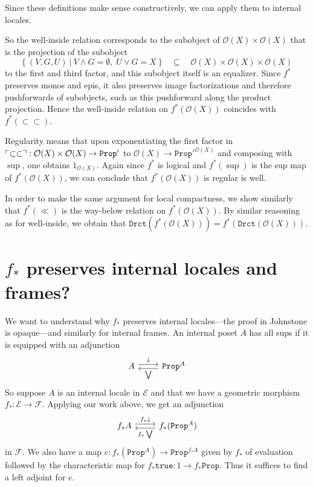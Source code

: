 \documentclass[11pt, oneside, article]{memoir}
\theoremstyle{plain}
\theoremstyle{definition}
\theoremstyle{remark}
\DeclarePairedDelimiter{\classify}{\ulcorner}{\urcorner}
\newcommand{\const}[1]{\mathtt{#1}}
\newcommand{\cat}[1]{\mathcal{#1}}
\newcommand{\Prop}{\const{Prop}}
\newcommand{\down}{\mathord{\downarrow}}
\newcommand{\true}{\const{true}}
\begin{document}
Since these definitions make sense constructively, we can apply them to internal locales.

So the well-inside relation corresponds to the subobject of $\mathcal{O}(X)\times\mathcal{O}(X)$ that is the projection of the subobject
\[
	\{ \: (V,G,U) \:|\: V\wedge G = \emptyset, \; U\vee G = X \: \} \quad \subseteq \quad \mathcal{O}(X)\times\mathcal{O}(X)\times\mathcal{O}(X)
\]
to the first and third factor, and this subobject itself is an equalizer. Since $f^*$ preserves monos and epis, it also preserves image factorizations and therefore pushforwards of subobjects, such as this pushforward along the product projection. Hence the well-inside relation on $f^*(\mathcal{O}(X))$ coincides with $f^*(\subset\subset)$.

Regularity means that upon exponentiating the first factor in $\classify{\subset\subset} : \mathcal{O}(X)\times\mathcal{O}(X)\to\Prop'$ to $\mathcal{O}(X)\to\Prop'^{\mathcal{O}(X)}$ and composing with $\sup$, one obtains $1_{\mathcal{O}(X)}$. Again since $f^*$ is logical and $f^*(\sup)$ is the sup map of $f^*(\mathcal{O}(X))$, we can conclude that $f^*(\mathcal{O}(X))$ is regular is well.

In order to make the same argument for local compactness, we show similarly that $f^*(\ll)$ is the way-below relation on $f^*(\mathcal{O}(X))$. By similar reasoning as for well-inside, we obtain that $\const{Drct}(f^*(\mathcal{O}(X))) = f^*(\const{Drct}(\mathcal{O}(X)))$.

\section{$f_*$ preserves internal locales and frames?}\label{sec.preserve_loc_frame}


We want to understand why $f_*$ preserves internal locales---the proof in Johnstone is opaque---and similarly for internal frames. An internal poset $A$ has all sups if it is equipped with an adjunction
\[
\begin{tikzcd}
	A\ar[r, shift left, "\down"]&\Prop^A\ar[l, shift left, "\bigvee"]
\end{tikzcd}
\]
So suppose $A$ is an internal locale in $\cat{E}$ and that we have a geometric morphism $f_*\colon\cat{E}\to\cat{F}$. Applying our work above, we get an adjunction
\[
\begin{tikzcd}
	f_*A\ar[r, shift left, "f_*\down"]&f_*(\Prop^A)\ar[l, shift left, "f_*\bigvee"]
\end{tikzcd}
\]
in $\cat{F}$. We also have a map $e\colon f_*(\Prop^A)\to\Prop^{f_*A}$ given by $f_*$ of evaluation followed by the characteristic map for $f_*\true\colon 1\to f_*\Prop$. Thus it suffices to find a left adjoint for $e$.
\end{document}
